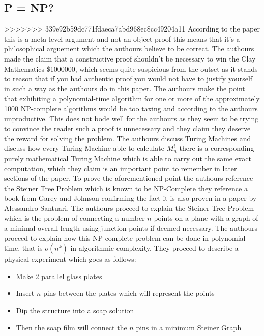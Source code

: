 \documentclass{report}
\begin{document}
\subsection{P = NP?}
>>>>>>> 339e92b59dc771fdaeca7abd968ec8cc49204a11
According to the paper this is a meta-level argument and not an object proof\cite{PVsNPSolved} this means that it's a philosophical arguement which the authours believe to be correct.  The authours made the claim that a constructive proof shouldn't be necessary to win the Clay Mathematics \$1000000\cite{Millennium}, which seems quite suspicious from the outset as it stands to reason that if you had authentic proof you would not have to justify yourself in such a way as the authours do in this paper\cite{PVsNPSolved}.  The authours make the point that exhibiting a polynomial-time algorithm for one or more of the approximately 1000 NP-complete algorithms would be too taxing and according to the authours unproductive\cite{PVsNPSolved}.  This does not bode well for the authours as they seem to be trying to convince the reader such a proof is unnecessary and they claim they deserve the reward for solving the problem\cite{PVsNPSolved}.  The authours discuss Turing Machines and discuss how every Turing Machine able to calculate $M^i_n$ there is a corresponding purely mathematical Turing Machine which is able to carry out the same exact computation, which they claim is an important point to remember in later sections of the paper.  To prove the aforementioned point the authours reference the Steiner Tree Problem which is known to be NP-Complete they reference a book from Garey and Johnson confirming the fact\cite{GaeryJohnson} it is also proven in a paper by Alessandro Santuari\cite{Steiner}.  The authours proceed to explain the Steiner Tree Problem which is the problem of connecting a number $n$ points on a plane with a graph of a minimal overall length using junction points if deemed necessary\cite{Steiner}.  The authours proceed to explain how this NP-complete problem can be done in polynomial time, that is $o(n^k)$ in algorithmic complexity.  They proceed to describe a physical experiment\cite{PVsNPSolved} which goes as follows:
\begin{itemize}
  \item Make 2 parallel glass plates
  \item Insert $n$ pins between the plates which will represent the points
  \item Dip the structure into a soap solution
  \item Then the soap film will connect the $n$ pins in a minimum Steiner Graph
\end{itemize}
\end{document}
